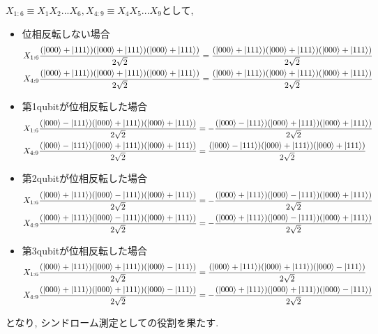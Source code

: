 \begin{ex}
    \label{ex10.5}
    $X_{1:6} \equiv X_1 X_2 ... X_6, X_{4:9} \equiv X_4 X_5 ... X_9$として,
    \begin{itemize}
        \item 位相反転しない場合
              \begin{align*}
                  X_{1:6}\frac{(\ket{000}+\ket{111})(\ket{000}+\ket{111})(\ket{000}+\ket{111})}{2\sqrt{2}} & = \frac{(\ket{000}+\ket{111})(\ket{000}+\ket{111})(\ket{000}+\ket{111})}{2\sqrt{2}} \\
                  X_{4:9}\frac{(\ket{000}+\ket{111})(\ket{000}+\ket{111})(\ket{000}+\ket{111})}{2\sqrt{2}} & = \frac{(\ket{000}+\ket{111})(\ket{000}+\ket{111})(\ket{000}+\ket{111})}{2\sqrt{2}} \\
              \end{align*}
        \item 第1qubitが位相反転した場合
              \begin{align*}
                  X_{1:6}\frac{(\ket{000}-\ket{111})(\ket{000}+\ket{111})(\ket{000}+\ket{111})}{2\sqrt{2}} & = -\frac{(\ket{000}-\ket{111})(\ket{000}+\ket{111})(\ket{000}+\ket{111})}{2\sqrt{2}} \\
                  X_{4:9}\frac{(\ket{000}-\ket{111})(\ket{000}+\ket{111})(\ket{000}+\ket{111})}{2\sqrt{2}} & = \frac{(\ket{000}-\ket{111})(\ket{000}+\ket{111})(\ket{000}+\ket{111})}{2\sqrt{2}}  \\
              \end{align*}
        \item 第2qubitが位相反転した場合
              \begin{align*}
                  X_{1:6}\frac{(\ket{000}+\ket{111})(\ket{000}-\ket{111})(\ket{000}+\ket{111})}{2\sqrt{2}} & = -\frac{(\ket{000}+\ket{111})(\ket{000}-\ket{111})(\ket{000}+\ket{111})}{2\sqrt{2}} \\
                  X_{4:9}\frac{(\ket{000}+\ket{111})(\ket{000}-\ket{111})(\ket{000}+\ket{111})}{2\sqrt{2}} & = -\frac{(\ket{000}+\ket{111})(\ket{000}-\ket{111})(\ket{000}+\ket{111})}{2\sqrt{2}} \\
              \end{align*}
        \item 第3qubitが位相反転した場合
              \begin{align*}
                  X_{1:6}\frac{(\ket{000}+\ket{111})(\ket{000}+\ket{111})(\ket{000}-\ket{111})}{2\sqrt{2}} & = \frac{(\ket{000}+\ket{111})(\ket{000}+\ket{111})(\ket{000}-\ket{111})}{2\sqrt{2}}  \\
                  X_{4:9}\frac{(\ket{000}+\ket{111})(\ket{000}+\ket{111})(\ket{000}-\ket{111})}{2\sqrt{2}} & = -\frac{(\ket{000}+\ket{111})(\ket{000}+\ket{111})(\ket{000}-\ket{111})}{2\sqrt{2}} \\
              \end{align*}
    \end{itemize}
    となり, シンドローム測定としての役割を果たす.
\end{ex}

